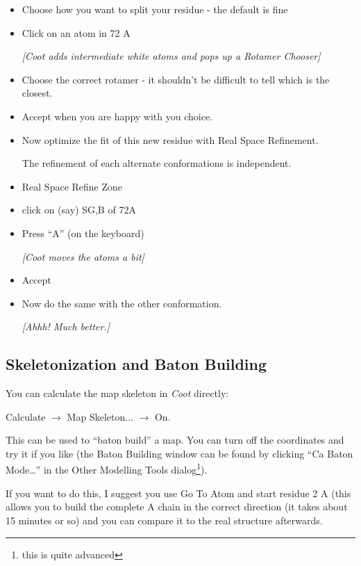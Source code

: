 \documentclass{article}
\begin{document}
\begin{itemize}
\item Choose how you want to split your residue - the default is fine

\item Click on an atom in 72 A

  \textsl{ [\emph{Coot} adds intermediate white atoms and pops up a Rotamer
    Chooser]}

\item Choose the correct rotamer - it shouldn't be difficult to tell
  which is the closest.

\item \textsf{Accept} when you are happy with you choice.

\item Now optimize the fit of this new residue with Real Space
  Refinement.

The refinement of each alternate conformations is independent.

\item \textsf{Real Space Refine Zone}

\item click on (say) SG,B of 72A

\item Press ``A'' (on the keyboard)

  \textsl{ [\emph{Coot} moves the atoms a bit]}

\item \textsf{Accept}

\item Now do the same with the other conformation.

   \emph{  [Ahhh!  Much better.]}

\end{itemize}

\subsection{Skeletonization and Baton Building}

You can calculate the map skeleton in \emph{Coot} directly:

\textsf{Calculate $\rightarrow$ Map Skeleton... $\rightarrow$ On.}

This can be used to ``baton build'' a map.  You can turn off the
coordinates and try it if you like (the Baton Building window can be
found by clicking \textsf{``Ca Baton Mode\ldots''} in the Other
Modelling Tools dialog\footnote{this is quite advanced}).

If you want to do this, I suggest you use Go To Atom and start residue
2 A (this allows you to build the complete A chain in the correct
direction (it takes about 15 minutes or so) and you can compare it to
the real structure afterwards.
\end{document}
